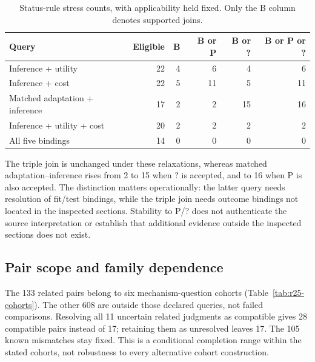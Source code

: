 \begin{table}[ht]\centering\small
\caption{Status-rule stress counts, with applicability held fixed. Only the B column denotes supported joins.}\label{tab:r25-relaxation}
\begin{tabular}{@{}lrrrrr@{}}\toprule
Query & Eligible & B & B or P & B or ? & B or P or ?\\\midrule
Inference + utility & 22 & 4 & 6 & 4 & 6\\
Inference + cost & 22 & 5 & 11 & 5 & 11\\
Matched adaptation + inference & 17 & 2 & 2 & 15 & 16\\
Inference + utility + cost & 20 & 2 & 2 & 2 & 2\\
All five bindings & 14 & 0 & 0 & 0 & 0\\
\bottomrule\end{tabular}\end{table}
The triple join is unchanged under these relaxations, whereas matched adaptation--inference rises from 2 to 15 when ? is accepted, and to 16 when P is also accepted. The distinction matters operationally: the latter query needs resolution of fit/test bindings, while the triple join needs outcome bindings not located in the inspected sections. Stability to P/? does not authenticate the source interpretation or establish that additional evidence outside the inspected sections does not exist.

\subsection{Pair scope and family dependence}
The 133 related pairs belong to six mechanism-question cohorts (Table~\ref{tab:r25-cohorts}). The other 608 are outside those declared queries, not failed comparisons. Resolving all 11 uncertain related judgments as compatible gives 28 compatible pairs instead of 17; retaining them as unresolved leaves 17. The 105 known mismatches stay fixed. This is a conditional completion range within the stated cohorts, not robustness to every alternative cohort construction.


